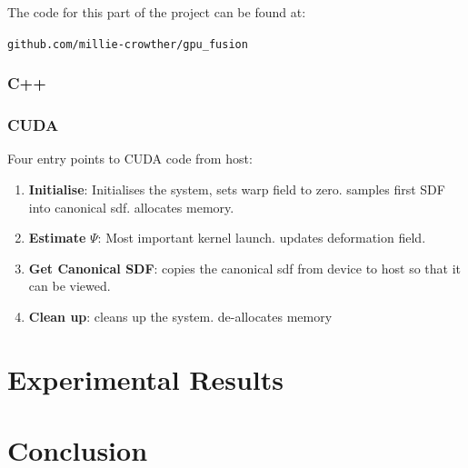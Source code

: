 \documentclass[12pt,twoside]{report}
\begin{document}
The code for this part of the project can be found at:

\begin{center}
\verb|github.com/millie-crowther/gpu_fusion|
\end{center}

\subsection{C++}

\subsection{CUDA}

Four entry points to CUDA code from host:

\begin{enumerate}
\item \textbf{Initialise}: Initialises the system, sets warp field to zero. samples first SDF into canonical sdf. allocates memory.

\item \textbf{Estimate} $\Psi$: Most important kernel launch. updates deformation field.

\item \textbf{Get Canonical SDF}: copies the canonical sdf from device to host so that it can be viewed.

\item \textbf{Clean up}: cleans up the system. de-allocates memory

\end{enumerate}


\chapter{Experimental Results}


\chapter{Conclusion}



\end{document}
